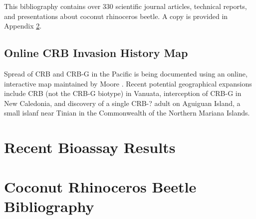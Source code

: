 \documentclass[12pt,letterpaper,english,bibliography=totocnumbered]{scrartcl}
\begin{document}
This bibliography contains over 330 scientific journal articles, technical reports, and presentations about coconut rhinoceros beetle. A copy is provided in Appendix \ref{crb-bibliography}.

\subsection{Online CRB Invasion History Map}

Spread of CRB and CRB-G in the Pacific is being documented using an online, interactive map maintained by Moore \cite{moore_web_2019}. Recent potential geographical expansions include CRB (not the CRB-G biotype) in Vanuata, interception of CRB-G in New Caledonia, and discovery of a single CRB-? adult on Aguiguan Island, a small islanf near Tinian in the Commonwealth of the Northern Mariana Islands.

\newpage
\printbibliography

\newpage
\appendix
\appendixpage
\addappheadtotoc

\section{Recent Bioassay Results}\label{recent-bioassay-results}










\section{Coconut Rhinoceros Beetle Bibliography}\label{crb-bibliography}

\end{document}
